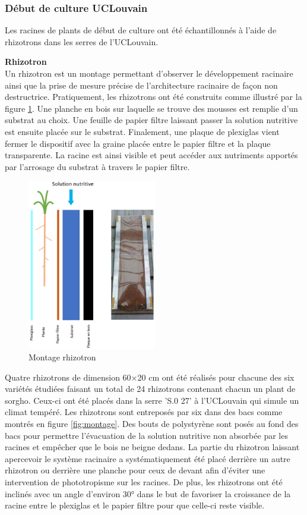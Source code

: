 \subsubsection{Début de culture UCLouvain}
Les racines de plants de début de culture ont été échantillonnés à l'aide de rhizotrons dans les serres de l'UCLouvain.
\newline

\textbf{Rhizotron} \\
Un rhizotron est un montage permettant d'observer le développement racinaire ainsi que la prise de mesure précise de l'architecture racinaire de façon non destructrice.
Pratiquement, les rhizotrons ont été construits comme illustré par la figure \ref{fig:rhizotron}.
Une planche en bois sur laquelle se trouve des mousses est remplie d'un substrat au choix.
Une feuille de papier filtre laissant passer la solution nutritive est ensuite placée sur le substrat.
Finalement, une plaque de plexiglas vient fermer le dispositif avec la graine placée entre le papier filtre et la plaque transparente.
La racine est ainsi visible et peut accéder aux nutriments apportés par l'arrosage du substrat à travers le papier filtre.
\newpage

\begin{figure}[ht]
\centering
\includegraphics[width=0.5\textwidth]{Image/rhizotron.png}
\caption{Montage rhizotron}
\label{fig:rhizotron}
\end{figure}

Quatre rhizotrons de dimension 60×20 cm ont été réalisés pour chacune des six variétés étudiées faisant un total de 24 rhizotrons contenant chacun un plant de sorgho.
Ceux-ci ont été placés dans la serre 'S.0 27' à l'UCLouvain qui simule un climat tempéré.
Les rhizotrons sont entreposés par six dans des bacs comme montrés en figure \ref{fig:montage}.
Des bouts de polystyrène sont posés au fond des bacs pour permettre l'évacuation de la solution nutritive non absorbée par les racines et empêcher que le bois ne beigne dedans.
La partie du rhizotron laissant apercevoir le système racinaire a systématiquement été placé derrière un autre rhizotron ou derrière une planche pour ceux de devant afin d'éviter une intervention de phototropisme sur les racines.
De plus, les rhizotrons ont été inclinés avec un angle d'environ 30° dans le but de favoriser la croissance de la racine entre le plexiglas et le papier filtre pour que celle-ci reste visible.
\newpage

